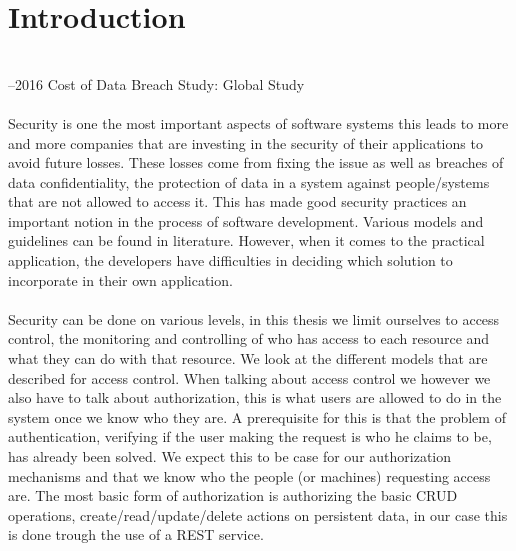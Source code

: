 \chapter{Introduction}
\label{chapt:Introduction}

\textbf{ }
\\

--2016 Cost of Data Breach Study: Global Study\cite{CostQuote}
\\
\\
Security is one the most important aspects of software systems this leads to more and more companies that are investing in the security of their applications to avoid future losses.
These losses come from fixing the issue as well as breaches of data confidentiality, the protection of data in a system against people/systems that are not allowed to access it. 
This has made good security practices an important notion in the process of software development.
Various models and guidelines can be found in literature. 
However, when it comes to the practical application, the developers have difficulties in deciding which solution to incorporate in their own application. %
\\
\\
Security can be done on various levels, in this thesis we limit ourselves to access control, the monitoring and controlling of who has access to each resource and what they can do with that resource.
We look at the different models that are described for access control.
When talking about access control we however we also have to talk about authorization, this is what users are allowed to do in the system once we know who they are.
A prerequisite for this is that the problem of authentication, verifying if the user making the request is who he claims to be, has already been solved.
We expect this to be case for our authorization mechanisms and that we know who the people (or machines) requesting access are. 
The most basic form of authorization is authorizing the basic CRUD operations, create/read/update/delete actions on persistent data, in our case this is done trough the use of a REST service.
